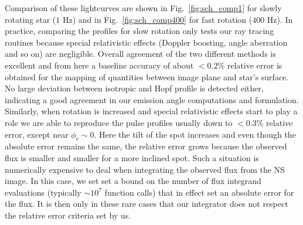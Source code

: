 \documentclass{aa}
\newcommand{\Msun}{\ensuremath{M_{\odot}}}
\begin{document}
Comparison of these lightcurves are shown in Fig.~\ref{fig:sch_comp1} for slowly rotating star ($1$ Hz) and in Fig.~\ref{fig:sch_comp400} for fast rotation ($400$ Hz).
In practice, comparing the profiles for slow rotation only tests our ray tracing routines because special relativistic effects (Doppler boosting, angle aberration and so on) are negligible.
Overall agreement of the two different methods is excellent and from here a baseline accuracy of about $<0.2\%$ relative error is obtained for the mapping of quantities between image plane and star's surface.
No large deviation between isotropic and Hopf profile is detected either, indicating a good agreement in our emission angle computations and formulation.
Similarly, when rotation is increased and special relativistic effects start to play a role we are able to reproduce the pulse profiles usually down to $<0.3\%$ relative error, except near $\phi_{\mathrm{e}} \sim 0$.
Here the tilt of the spot increases and even though the absolute error remains the same, the relative error grows because the observed flux is smaller and smaller for a more inclined spot.
Such a situation is numerically expensive to deal when integrating the observed flux from the NS image.
In this case, we set set a bound on the number of flux integrand evaluations (typically $\sim 10^7$ function calls) that in effect set an absolute error for the flux.
It is then only in these rare cases that our integrator does not respect the relative error criteria set by us.


\end{document}

